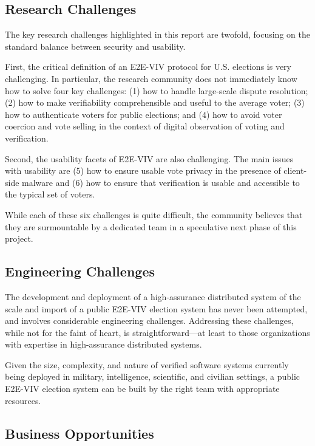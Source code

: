 \subsection{Research Challenges}

The key research challenges highlighted in this report are twofold,
focusing on the standard balance between security and usability.

First, the critical definition of an E2E-VIV protocol for
U.S. elections is very challenging. In particular, the research
community does not immediately know how to solve four key challenges:
(1) how to handle large-scale dispute resolution; (2) how to make
verifiability comprehensible and useful to the average voter; (3) how
to authenticate voters for public elections; and (4) how to avoid
voter coercion and vote selling in the context of digital observation
of voting and verification.

Second, the usability facets of E2E-VIV are also challenging. The main
issues with usability are (5) how to ensure usable vote privacy in the
presence of client-side malware and (6) how to ensure that
verification is usable and accessible to the typical set of voters.

While each of these six challenges is quite difficult, the community
believes that they are surmountable by a dedicated team in a
speculative next phase of this project.

\subsection{Engineering Challenges}

The development and deployment of a high-assurance distributed system
of the scale and import of a public E2E-VIV election system has never
been attempted, and involves considerable engineering
challenges. Addressing these challenges, while not for the faint of
heart, is straightforward---at least to those organizations with
expertise in high-assurance distributed systems.

Given the size, complexity, and nature of verified software systems
currently being deployed in military, intelligence, scientific, and
civilian settings, a public E2E-VIV election system can be built by
the right team with appropriate resources.

\subsection{Business Opportunities}

